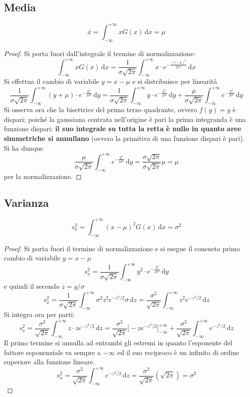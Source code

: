 \documentclass[10pt, oneside]{book}
\begin{document}
\subsection{Media}
\[\overline{x} = \int_{-\infty}^{+\infty} x G(x) \, \mathrm{d}x = \mu\]
\begin{proof}
Si porta fuori dall'integrale il termine di normalizzazione:
\[\int_{-\infty}^{+\infty} x G(x) \, \mathrm{d}x = \frac{1}{\sigma \sqrt{2 \pi}} \int_{-\infty}^{+\infty} x \cdot e^{\displaystyle - \frac{(x-\mu)^2}{2 \sigma^2}} \, \mathrm{d}x\]
Si effettua il cambio di variabile $y = x - \mu$ e si distribuisce per linearità
\[\frac{1}{\sigma \sqrt{2 \pi}} \int_{-\infty}^{+\infty} (y+\mu) \cdot e^{\displaystyle - \frac{y^2}{2 \sigma^2}} \, \mathrm{d}y = \frac{1}{\sigma \sqrt{2 \pi}} \int_{-\infty}^{+\infty} y \cdot e^{\displaystyle - \frac{y^2}{2 \sigma^2}} \, \mathrm{d}y + \frac{\mu}{\sigma \sqrt{2 \pi}} \int_{-\infty}^{+\infty} e^{\displaystyle - \frac{y^2}{2 \sigma^2}} \, \mathrm{d}y\]
Si osserva ora che la bisettrice del primo terzo quadrante, ovvero $f(y) = y$ è dispari; poiché la gaussiana centrata nell'origine è pari la prima integranda è una funzione dispari: \textbf{il suo integrale su tutta la retta è nullo in quanto aree simmetriche si annullano} (ovvero la primitiva di una funzione dispari è pari). Si ha dunque
\[\frac{\mu}{\sigma \sqrt{2 \pi}} \int_{-\infty}^{+\infty} e^{\displaystyle - \frac{y^2}{2 \sigma^2}} \, \mathrm{d}y = \frac{\sigma \sqrt{2\pi}}{\sigma \sqrt{2\pi}} \mu = \mu\]
per la normalizzazione.
\end{proof}

\subsection{Varianza}
\[s_x^2 = \int_{-\infty}^{+\infty} (x - \mu)^2 G(x) \, \mathrm{d}x = \sigma^2\]
\begin{proof}
Si porta fuori il termine di normalizzazione e si esegue il consueto primo cambio di variabile $y = x - \mu$
\[s_x^2 = \frac{1}{\sigma \sqrt{2\pi}}\int_{-\infty}^{+\infty} y^2 \cdot e^{\displaystyle - \frac{y^2}{2\sigma^2}} \, \mathrm{d}y\]
e quindi il secondo $z = y/\sigma$
\[s_x^2 = \frac{1}{\sigma \sqrt{2\pi}} \int_{-\infty}^{+\infty} \sigma^2 z^2 e^{- z^2/2} \sigma\, \mathrm{d}z = \frac{\sigma^2}{\sqrt{2\pi}} \int_{-\infty}^{+\infty} z^2 e^{- z^2/2} \, \mathrm{d}z\]
Si integra ora per parti:
\[s_x^2 = \frac{\sigma^2}{\sqrt{2\pi}} \int_{-\infty}^{+\infty} z \cdot z e^{- z^2/2} \, \mathrm{d}z = \frac{\sigma^2}{\sqrt{2\pi}} \bigg[-z e^{-z^2/2}\bigg]_{-\infty}^{+\infty} + \frac{\sigma^2}{\sqrt{2\pi}} \int_{-\infty}^{+\infty} e^{- z^2/2} \, \mathrm{d}z\]
Il primo termine si annulla ad entrambi gli estremi in quanto l'esponente del fattore esponenziale va sempre a $-\infty$ ed il suo reciproco è un infinito di ordine superiore alla funzione lineare.
\[s_x^2 = \frac{\sigma^2}{\sqrt{2\pi}} \int_{-\infty}^{+\infty} e^{- z^2/2} \, \mathrm{d}z = \frac{\sigma^2}{\sqrt{2\pi}} (\sqrt{2 \pi}) = \sigma^2\]
\end{proof}
\end{document}
